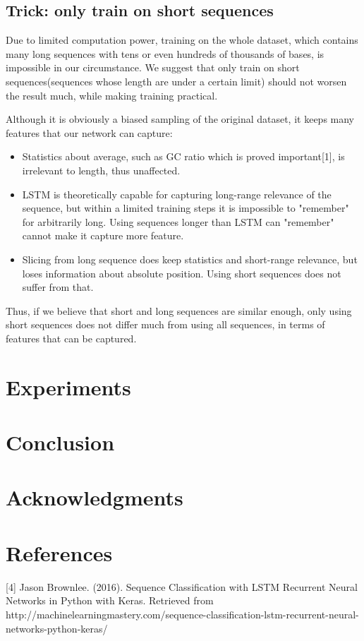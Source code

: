 \documentclass[10pt,a4paper]{article}
\begin{document}
\begin{spacing}{1.5}
\subsection{Trick: only train on short sequences}
\par Due to limited computation power, training on the whole dataset, which contains many long sequences with tens or even hundreds of thousands of bases, is impossible in our circumstance. We suggest that only train on short sequences(sequences whose length are under a certain limit) should not worsen the result much, while making training practical.
\par Although it is obviously a biased sampling of the original dataset, it keeps many features that our network can capture:
\begin{itemize}
\item Statistics about average, such as GC ratio which is proved important[1], is irrelevant to length, thus unaffected.
\item LSTM is theoretically capable for capturing long-range relevance of the sequence, but within a limited training steps it is impossible to "remember" for arbitrarily long. Using sequences longer than LSTM can "remember" cannot make it capture more feature.
\item Slicing from long sequence does keep statistics and short-range relevance, but loses information about absolute position. Using short sequences does not suffer from that.
\end{itemize}
Thus, if we believe that short and long sequences are similar enough, only using short sequences does not differ much from using all sequences, in terms of features that can be captured. 
\section{Experiments}

\section{Conclusion}

\section*{Acknowledgments}

\newpage

\section*{References}

[4] Jason Brownlee. (2016). Sequence Classification with LSTM Recurrent Neural Networks in Python with Keras. Retrieved from http://machinelearningmastery.com/sequence-classification-lstm-recurrent-neural-networks-python-keras/
\end{spacing}
\end{document}
